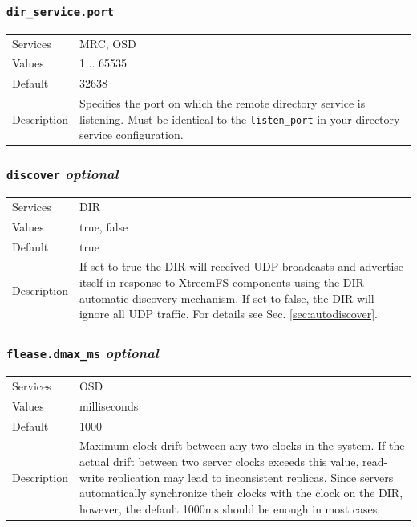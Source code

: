 \documentclass[a4paper,10pt]{book}
\begin{document}
\subsubsection{\texttt{dir\_service.port}}
\begin{tabular}{lp{10cm}}
 Services & MRC, OSD\\
 Values   & 1 .. 65535 \\
 Default  & 32638 \\
 Description & Specifies the port on which the remote directory service is listening. Must be identical to the \texttt{listen\_port} in your directory service configuration.
\end{tabular}

\subsubsection{\texttt{discover} \textit{optional}}
\begin{tabular}{lp{10cm}}
 Services & DIR\\
 Values   & true, false \\
 Default  & true \\
 Description & If set to true the DIR will received UDP broadcasts and advertise itself in response to XtreemFS components using the DIR automatic discovery mechanism. If set to false, the DIR will ignore all UDP traffic. For details see Sec. \ref{sec:autodiscover}.
\end{tabular}

\subsubsection{\texttt{flease.dmax\_ms} \textit{optional}}
\begin{tabular}{lp{10cm}}
 Services & OSD\\
 Values   & milliseconds \\
 Default  & 1000 \\
 Description & Maximum clock drift between any two clocks in the system. If the actual drift between two server clocks exceeds this value, read-write replication may lead to inconsistent replicas. Since servers automatically synchronize their clocks with the clock on the DIR, however, the default 1000ms should be enough in most cases.
\end{tabular}
\end{document}
